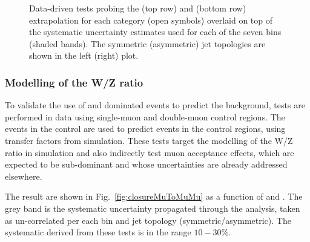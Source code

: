 \begin{figure}[h!]
\begin{center}
    \caption{Data-driven tests probing the \alphat (top row) and \bdphi (bottom row) extrapolation for each
      \njet category (open symbols) overlaid on top of the systematic
      uncertainty estimates used for each of the seven \scalht bins (shaded bands). 
      The symmetric (asymmetric) jet topologies are shown in the left (right) plot. 
    }
    \label{fig:closureAlphaT}
  \end{center} 
\end{figure}



\subsubsection*{Modelling of the W/Z ratio}
\label{sec:tfSyst_WZratio}
To validate the use of \wmj and \ttbar dominated \mj events to predict the \znunu
background, tests are performed in data using single-muon and double-muon control regions. 
The events in the \mj control are used to predict events in the \mmj control regions, 
using transfer factors from simulation. 
These tests target the modelling of the W/Z ratio in simulation and 
also indirectly test muon acceptance effects, which 
are expected to be sub-dominant and whose uncertainties are already addressed elsewhere.

The result are shown in Fig.~\ref{fig:closureMuToMuMu} as a function of \scalht and \njet. 
The grey band is the systematic uncertainty propagated through the analysis, 
taken as un-correlated per each \scalht bin and jet topology (symmetric/asymmetric). The systematic derived from these tests is
in the range $10-30\%$.




